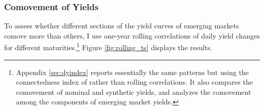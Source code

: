 {%


\subsubsection{Comovement of Yields}

To assess whether different sections of the yield curves of emerging markets comove more than others, I use one-year rolling correlations of daily yield changes for different maturities.\footnote{ Appendix \ref{sec:dyindex} reports essentially the same patterns but using the connectedness index of \cite{DieboldYilmaz:2014} rather than rolling correlations. It also compares the comovement of nominal and synthetic yields, and analyzes the comovement among the components of emerging market yields.} Figure \ref{fig:rolling_ts} displays the results.




}
